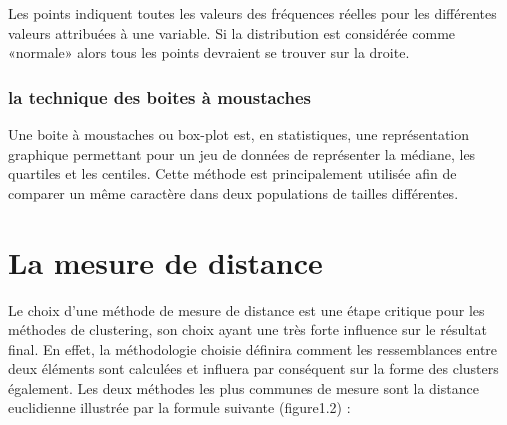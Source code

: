 \documentclass[memoire.tex]{subfiles}
\begin{document}
Les points indiquent toutes les valeurs des fréquences réelles pour les différentes valeurs attribuées à une variable. Si la distribution est considérée comme «normale» alors tous les points devraient se trouver sur la droite.
\subsubsection{la technique des boites à moustaches}

Une boite à moustaches ou box-plot est, en statistiques, une représentation graphique permettant pour un jeu de données de représenter la médiane, les quartiles et les centiles. Cette méthode est principalement utilisée afin de comparer un même caractère dans deux populations de tailles différentes.
\section{La mesure de distance}
Le choix d'une méthode de mesure de distance est une étape critique pour les méthodes de clustering, son choix ayant une très forte influence sur le résultat final. En effet, la méthodologie choisie définira comment les ressemblances entre deux éléments sont calculées et influera par conséquent sur la forme des clusters également. Les deux méthodes les plus communes de mesure sont la distance euclidienne illustrée par la formule suivante (figure1.2) : 
\end{document}

